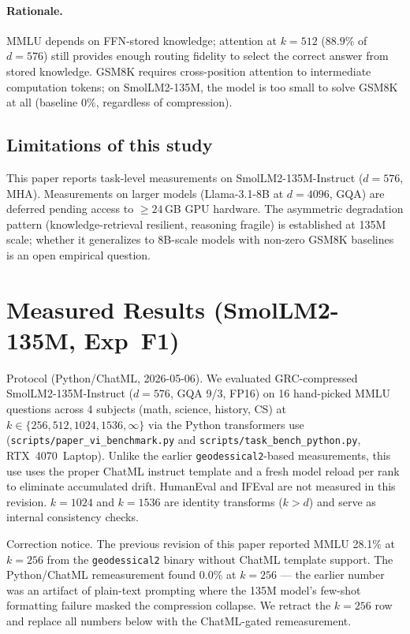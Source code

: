 \documentclass[11pt]{article}
\begin{document}
\paragraph{Rationale.}  MMLU depends on FFN-stored knowledge; attention
at $k{=}512$ ($88.9\%$ of $d{=}576$) still provides enough routing fidelity
to select the correct answer from stored knowledge.  GSM8K requires
cross-position attention to intermediate computation tokens; on
SmolLM2-135M, the model is too small to solve GSM8K at all
(baseline $0\%$, regardless of compression).

\subsection{Limitations of this study}
This paper reports task-level measurements on SmolLM2-135M-Instruct
($d{=}576$, MHA).  Measurements on larger models (Llama-3.1-8B at
$d{=}4096$, GQA) are deferred pending access to $\ge 24$\,GB GPU
hardware.  The asymmetric degradation pattern (knowledge-retrieval
resilient, reasoning fragile) is established at 135M scale; whether it
generalizes to 8B-scale models with non-zero GSM8K baselines is an
open empirical question.

\section{Measured Results (SmolLM2-135M, Exp~F1)}
\label{sec:measured-f1}

Protocol (Python/ChatML, 2026-05-06).  We evaluated
GRC-compressed SmolLM2-135M-Instruct ($d{=}576$, GQA 9/3, FP16) on
16 hand-picked MMLU questions across 4 subjects (math, science, history,
CS) at $k\in\{256,512,1024,1536,\infty\}$ via the Python transformers use
(\texttt{scripts/paper\_vi\_benchmark.py} and
\texttt{scripts/task\_bench\_python.py}, RTX~4070~Laptop).  Unlike the
earlier \texttt{geodessical2}-based measurements, this use uses the
proper ChatML instruct template and a fresh model reload per rank to
eliminate accumulated drift.  HumanEval and IFEval are not measured in
this revision.  $k{=}1024$ and $k{=}1536$ are identity transforms
($k > d$) and serve as internal consistency checks.

Correction notice.  The previous revision of this paper reported
MMLU 28.1\% at $k{=}256$ from the \texttt{geodessical2} binary without
ChatML template support.  The Python/ChatML remeasurement found
0.0\% at $k{=}256$ --- the earlier number was an artifact of
plain-text prompting where the 135M model's few-shot formatting failure
masked the compression collapse.  We retract the $k{=}256$ row and
replace all numbers below with the ChatML-gated remeasurement.
\end{document}
